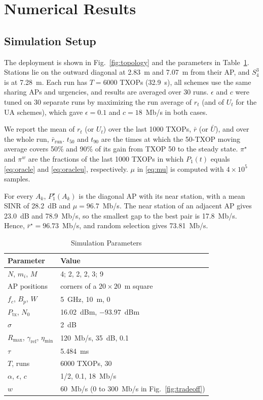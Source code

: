\documentclass[journal]{IEEEtran}
\theoremstyle{definition}
\theoremstyle{remark}
\theoremstyle{plain}
\begin{document}
\section{Numerical Results}\label{sec4}
\subsection{Simulation Setup}
The deployment is shown in Fig.~\ref{fig:topology} and the parameters in Table~\ref{tab:params}. Stations lie on the outward diagonal at 2.83~m and 7.07~m from their AP, and $S_4^3$ is at 7.28~m. Each run has $T=6000$ TXOPs (32.9~s), all schemes use the same sharing APs and urgencies, and results are averaged over 30 runs. $\epsilon$ and $c$ were tuned on 30 separate runs by maximizing the run average of $r_t$ (and of $U_t$ for the UA schemes), which gave $\epsilon=0.1$ and $c=18$~Mb/s in both cases.

We report the mean of $r_t$ (or $U_t$) over the last 1000 TXOPs, $\bar{r}$ (or $\bar{U}$), and over the whole run, $\bar{r}_{\mathrm{run}}$. $t_{50}$ and $t_{90}$ are the times at which the 50-TXOP moving average covers 50\% and 90\% of its gain from TXOP 50 to the steady state. $\pi^\star$ and $\pi^w$ are the fractions of the last 1000 TXOPs in which $P_1(t)$ equals \eqref{eq:oracle} and \eqref{eq:oracleu}, respectively. $\mu$ in \eqref{eq:mu} is computed with $4\times10^{5}$ samples.

For every $A_k$, $P_1^\star(A_k)$ is the diagonal AP with its near station, with a mean SINR of 28.2~dB and $\mu=96.7$~Mb/s. The near station of an adjacent AP gives 23.0~dB and 78.9~Mb/s, so the smallest gap to the best pair is 17.8~Mb/s. Hence, $\bar{r}^\star=96.73$~Mb/s, and random selection gives 73.81~Mb/s.

\begin{table}[t]
\caption{Simulation Parameters}
\label{tab:params}
\centering
\footnotesize
\begin{tabular}{@{}ll@{}}
\toprule
Parameter & Value\\
\midrule
$N$, $m_i$, $M$ & 4; 2, 2, 2, 3; 9\\
AP positions & corners of a $20\times20$~m square\\
$f_c$, $B_p$, $W$ & 5~GHz, 10~m, 0\\
$P_{\mathrm{tx}}$, $N_0$ & 16.02~dBm, $-93.97$~dBm\\
$\sigma$ & 2~dB\\
$R_{\max}$, $\gamma_{\mathrm{ref}}$, $\eta_{\min}$ & 120~Mb/s, 35~dB, 0.1\\
$\tau$ & 5.484~ms \cite{kosek2020tuning}\\
$T$, runs & 6000 TXOPs, 30\\
$\alpha$, $\epsilon$, $c$ & 1/2, 0.1, 18~Mb/s\\
$w$ & 60~Mb/s (0 to 300~Mb/s in Fig.~\ref{fig:tradeoff})\\
\bottomrule
\end{tabular}
\end{table}
\end{document}
